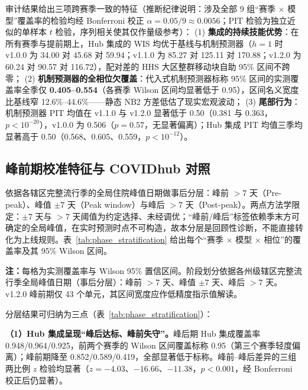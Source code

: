 \documentclass[10pt,UTF8,a4paper,zihao=-4]{ctexart}
\theoremstyle{plain}
\theoremstyle{definition}
\theoremstyle{remark}
\begin{document}
审计结果给出三项跨赛季一致的特征（推断纪律说明：涉及全部 9 组“赛季 $\times$ 模型”覆盖率的检验均经 Bonferroni 校正 $\alpha = 0.05/9 \approx 0.0056$；PIT 检验为独立近似的单样本 $t$ 检验，序列相关使其仅作量级参考）：
(1) \textbf{集成的持续技能优势}：在所有赛季与提前期上，Hub 集成的 WIS 均优于基线与机制预测器（$h=1$ 时 v1.0.0 为 34.00 对 45.68 对 59.94；v1.1.0 为 85.27 对 125.11 对 170.88；v1.2.0 为 60.24 对 90.57 对 116.72），配对差的 HHS 大区整群移动块自助 95\% 区间不跨零；
(2) \textbf{机制预测器的全相位欠覆盖}：代入式机制预测器标称 95\% 区间的实测覆盖率全季仅 \textbf{0.405--0.554}（各赛季 Wilson 区间均显著低于 0.95），区间名义宽度比基线窄 12.6\%--44.6\%——静态 NB2 方差低估了现实宏观波动；
(3) \textbf{尾部行为}：机制预测器 PIT 均值在 v1.1.0 与 v1.2.0 显著低于 0.50（0.381 与 0.363，$p<10^{-20}$），v1.0.0 为 0.506（$p=0.57$，无显著偏离）；Hub 集成 PIT 均值三季均显著高于 0.50（0.568、0.605、0.559，$p<10^{-12}$）。

\subsection{峰前期校准特征与 COVIDhub 对照}\label{sec:phase_collapse}

依据各辖区完整流行季的全局住院峰值日期做事后分层：峰前 $>7$ 天（Pre-peak）、峰值 $\pm 7$ 天（Peak window）与峰后 $>7$ 天（Post-peak）。两点方法学限定：$\pm 7$ 天与 $>7$ 天阈值为约定选择、未经调优；“峰前/峰后”标签依赖季末方可确定的全局峰值，在实时预测时点不可构造，故本分层是回顾性诊断，不能直接转化为上线规则。表~\ref{tab:phase_stratification} 给出每个“赛季 $\times$ 模型 $\times$ 相位”的覆盖率及其 95\% Wilson 区间。

\begin{table}[htbp]
\centering
\footnotesize
\caption{CDC FluSight 按全局峰值相对位置分层的 95\% 区间实测覆盖率及 Wilson 置信区间（$h=1$ 周，严格四方交集）}
\label{tab:phase_stratification}
\setlength{\tabcolsep}{4pt}

\vspace{2pt}
\begin{flushleft}
\scriptsize \textbf{注：}每格为实测覆盖率与 Wilson 95\% 置信区间。阶段划分依据各州级辖区完整流行季全局峰值日期（事后分层）：峰前 $>7$ 天、峰值 $\pm 7$ 天、峰后 $>7$ 天。v1.2.0 峰前期仅 43 个单元，其区间宽度应作低精度指示值解读。
\end{flushleft}
\end{table}

分层结果可归纳为三点（表~\ref{tab:phase_stratification}）：

\textbf{（1）Hub 集成呈现“峰后达标、峰前失守”。}峰后期 Hub 集成覆盖率 0.948/0.964/0.925，前两个赛季的 Wilson 区间覆盖标称 0.95（第三个赛季轻度偏离）；峰前期降至 0.852/0.589/0.419，全部显著低于标称。峰前--峰后差异的三组两比例 $z$ 检验均显著（$z=-4.03$、$-16.66$、$-11.38$，$p<0.001$，经 Bonferroni 校正后仍显著）。
\end{document}

